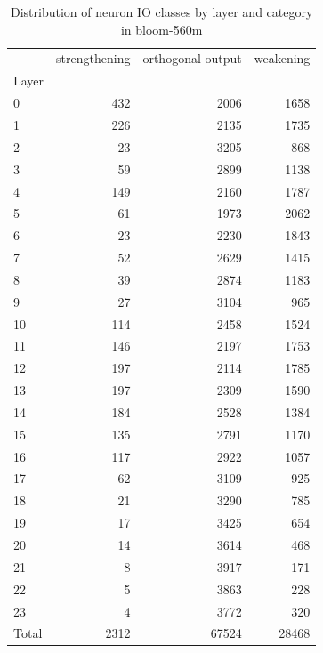\begin{table}
\caption{Distribution of neuron IO classes by layer and category in bloom-560m}
\label{tab:bloom-560m}
\begin{tabular}{lrrr}
 & strengthening & orthogonal output & weakening \\
Layer &  &  &  \\
0 & 432 & 2006 & 1658 \\
1 & 226 & 2135 & 1735 \\
2 & 23 & 3205 & 868 \\
3 & 59 & 2899 & 1138 \\
4 & 149 & 2160 & 1787 \\
5 & 61 & 1973 & 2062 \\
6 & 23 & 2230 & 1843 \\
7 & 52 & 2629 & 1415 \\
8 & 39 & 2874 & 1183 \\
9 & 27 & 3104 & 965 \\
10 & 114 & 2458 & 1524 \\
11 & 146 & 2197 & 1753 \\
12 & 197 & 2114 & 1785 \\
13 & 197 & 2309 & 1590 \\
14 & 184 & 2528 & 1384 \\
15 & 135 & 2791 & 1170 \\
16 & 117 & 2922 & 1057 \\
17 & 62 & 3109 & 925 \\
18 & 21 & 3290 & 785 \\
19 & 17 & 3425 & 654 \\
20 & 14 & 3614 & 468 \\
21 & 8 & 3917 & 171 \\
22 & 5 & 3863 & 228 \\
23 & 4 & 3772 & 320 \\
Total & 2312 & 67524 & 28468 \\
\end{tabular}
\end{table}
